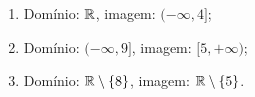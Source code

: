 \begin{enumerate}
	\item Domínio: $\mathbb{R}$, imagem: $(-\infty,4]$;
	\item Domínio: $(-\infty,9]$, imagem: $[5,+\infty)$;
	\item Domínio: $\mathbb{R}\setminus\{8\}$, imagem: $\mathbb{R}\setminus\{5\}$.
\end{enumerate}
